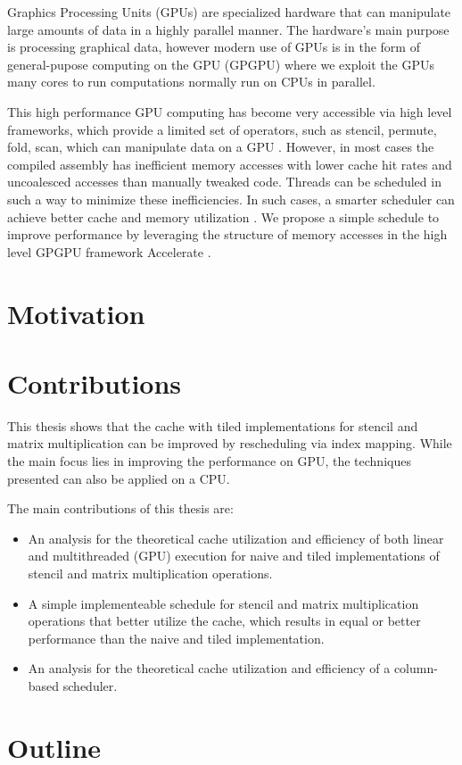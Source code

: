 Graphics Processing Units (GPUs) are specialized hardware that can manipulate large amounts of data in a highly parallel manner.
The hardware's main purpose is processing graphical data, however modern use of GPUs is in the form of general-pupose computing on the GPU (GPGPU) where we exploit the GPUs many cores to run computations normally run on CPUs in parallel.

This high performance GPU computing has become very accessible via high level frameworks, which provide a limited set of operators, such as stencil, permute, fold, scan, which can manipulate data on a GPU \cite{chakravarty2011accelerating}.
However, in most cases the compiled assembly has inefficient memory accesses with lower cache hit rates and uncoalesced accesses than manually tweaked code.
Threads can be scheduled in such a way to minimize these inefficiencies.
In such cases, a smarter scheduler can achieve better cache and memory utilization \cite{nugteren2014study}.
We propose a simple schedule to improve performance by leveraging the structure of memory accesses in the high level GPGPU framework Accelerate \cite{chakravarty2011accelerating}.

\section{Motivation}

\section{Contributions}
This thesis shows that the cache with tiled implementations for stencil and matrix multiplication can be improved by rescheduling via index mapping.
While the main focus lies in improving the performance on GPU, the techniques presented can also be applied on a CPU.

\vspace{1em}
The main contributions of this thesis are:
\begin{itemize}
    \item An analysis for the theoretical cache utilization and efficiency of both linear and multithreaded (GPU) execution for naive and tiled implementations of stencil and matrix multiplication operations.
    \item A simple implementeable schedule for stencil and matrix multiplication operations that better utilize the cache, which results in equal or better performance than the naive and tiled implementation.
    \item An analysis for the theoretical cache utilization and efficiency of a column-based scheduler.
\end{itemize}

\section{Outline}
